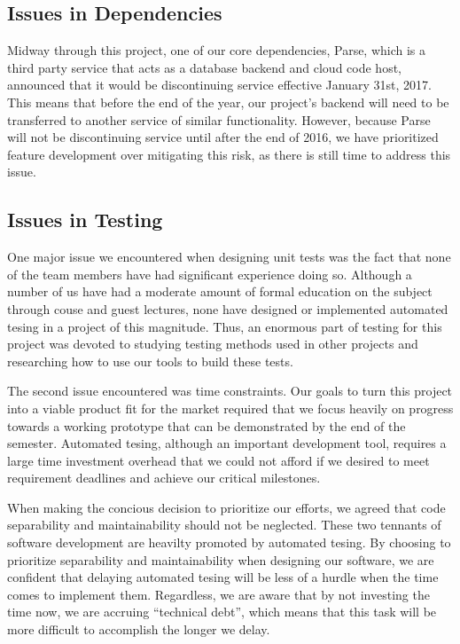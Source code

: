 \subsection{Issues in Dependencies}

Midway through this project, one of our core dependencies, Parse, which is a
third party service that acts as a database backend and cloud code host,
announced that it would be discontinuing service effective January 31st, 2017.
This means that before the end of the year, our project's backend will need to
be transferred to another service of similar functionality. However, because
Parse will not be discontinuing service until after the end of 2016, we have
prioritized feature development over mitigating this risk, as there is still
time to address this issue.


\subsection{Issues in Testing}

One major issue we encountered when designing unit tests was the fact that none
of the team members have had significant experience doing so. Although a number
of us have had a moderate amount of formal education on the subject through
couse and guest lectures, none have designed or implemented automated tesing in
a project of this magnitude. Thus, an enormous part of testing for this project
was devoted to studying testing methods used in other projects and researching
how to use our tools to build these tests.

The second issue encountered was time constraints. Our goals to turn this
project into a viable product fit for the market required that we focus heavily
on progress towards a working prototype that can be demonstrated by the end of
the semester. Automated tesing, although an important development tool, requires
a large time investment overhead that we could not afford if we desired to meet
requirement deadlines and achieve our critical milestones.

When making the concious decision to prioritize our efforts, we agreed that code
separability and maintainability should not be neglected. These two tennants of
software development are heavilty promoted by automated tesing. By choosing to
prioritize separability and maintainability when designing our software, we are
confident that delaying automated tesing will be less of a hurdle when the time
comes to implement them. Regardless, we are aware that by not investing the time
now, we are accruing ``technical debt'', which means that this task will be more
difficult to accomplish the longer we delay.


